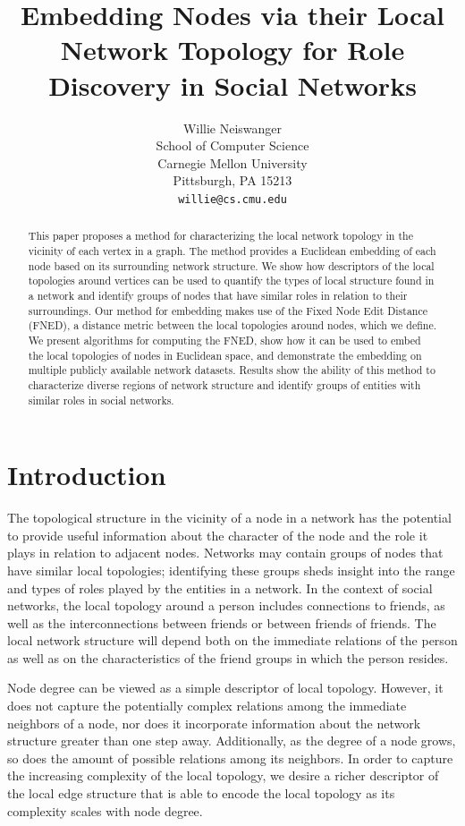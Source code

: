 \documentclass{article}
\title{Embedding Nodes via their Local Network Topology for Role Discovery in Social Networks}
\author{
Willie Neiswanger\\
School of Computer Science\\
Carnegie Mellon University\\
Pittsburgh, PA 15213 \\
\texttt{willie@cs.cmu.edu} \\
}
\begin{document}
\maketitle

\begin{abstract}
This paper proposes a method for characterizing the local network topology in the vicinity of each vertex in a graph. The method provides a Euclidean embedding of each node based on its surrounding network structure. We show how descriptors of the local topologies around vertices can be used to quantify the types of local structure found in a network and identify groups of nodes that have similar roles in relation to their surroundings. Our method for embedding makes use of the Fixed Node Edit Distance (FNED), a distance metric between the local topologies around nodes, which we define. We present algorithms for computing the FNED, show how it can be used to embed the local topologies of nodes in Euclidean space, and demonstrate the embedding on multiple publicly available network datasets. Results show the ability of this method to characterize diverse regions of network structure and identify groups of entities with similar roles in social networks.
\end{abstract}


\section{Introduction}
\label{sec:intro}

The topological structure in the vicinity of a node in a network has the potential to provide useful information about the character of the node and the role it plays in relation to adjacent nodes. Networks may contain groups of nodes that have similar local topologies; identifying these groups sheds insight into the range and types of roles played by the entities in a network. In the context of social networks, the local topology around a person includes connections to friends, as well as the interconnections between friends or between friends of friends. The local network structure will depend both on the immediate relations of the person as well as on the characteristics of the friend groups in which the person resides.%

Node degree can be viewed as a simple descriptor of local topology. However, it does not capture the potentially complex relations among the immediate neighbors of a node, nor does it incorporate information about the network structure greater than one step away. Additionally, as the degree of a node grows, so does the amount of possible relations among its neighbors. In order to capture the increasing complexity of the local topology, we desire a richer descriptor of the local edge structure that is able to encode the local topology as its complexity scales with node degree.
\end{document}
